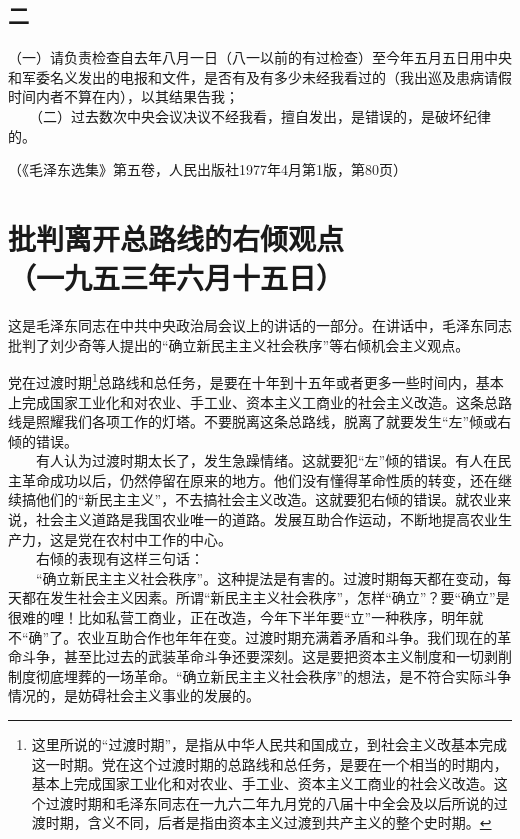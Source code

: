 \documentclass[cn,11pt,chinese]{elegantbook}
\def\myformat#1{\hfil\hfil #1}
\begin{document}
\subsection*{\myformat{二}}
（一）请负责检查自去年八月一日（八一以前的有过检查）至今年五月五日用中央和军委名义发出的电报和文件，是否有及有多少未经我看过的（我出巡及患病请假时间内者不算在内），以其结果告我；\\
　　（二）过去数次中央会议决议不经我看，擅自发出，是错误的，是破坏纪律的。\\
\begin{flushright}（《毛泽东选集》第五卷，人民出版社1977年4月第1版，第80页）\end{flushright}
\newpage\section*{\myformat{批判离开总路线的右倾观点}\\\myformat{（一九五三年六月十五日）}}
\begin{introduction}\item  这是毛泽东同志在中共中央政治局会议上的讲话的一部分。在讲话中，毛泽东同志批判了刘少奇等人提出的“确立新民主主义社会秩序”等右倾机会主义观点。\end{introduction}
党在过渡时期\footnote[1]{ 这里所说的“过渡时期”，是指从中华人民共和国成立，到社会主义改基本完成这一时期。党在这个过渡时期的总路线和总任务，是要在一个相当的时期内，基本上完成国家工业化和对农业、手工业、资本主义工商业的社会义改造。这个过渡时期和毛泽东同志在一九六二年九月党的八届十中全会及以后所说的过渡时期，含义不同，后者是指由资本主义过渡到共产主义的整个史时期。}总路线和总任务，是要在十年到十五年或者更多一些时间内，基本上完成国家工业化和对农业、手工业、资本主义工商业的社会主义改造。这条总路线是照耀我们各项工作的灯塔。不要脱离这条总路线，脱离了就要发生“左”倾或右倾的错误。\\
　　有人认为过渡时期太长了，发生急躁情绪。这就要犯“左”倾的错误。有人在民主革命成功以后，仍然停留在原来的地方。他们没有懂得革命性质的转变，还在继续搞他们的“新民主主义”，不去搞社会主义改造。这就要犯右倾的错误。就农业来说，社会主义道路是我国农业唯一的道路。发展互助合作运动，不断地提高农业生产力，这是党在农村中工作的中心。\\
　　右倾的表现有这样三句话：\\
　　“确立新民主主义社会秩序”。这种提法是有害的。过渡时期每天都在变动，每天都在发生社会主义因素。所谓“新民主主义社会秩序”，怎样“确立”？要“确立”是很难的哩！比如私营工商业，正在改造，今年下半年要“立”一种秩序，明年就不“确”了。农业互助合作也年年在变。过渡时期充满着矛盾和斗争。我们现在的革命斗争，甚至比过去的武装革命斗争还要深刻。这是要把资本主义制度和一切剥削制度彻底埋葬的一场革命。“确立新民主主义社会秩序”的想法，是不符合实际斗争情况的，是妨碍社会主义事业的发展的。\\
\end{document}

